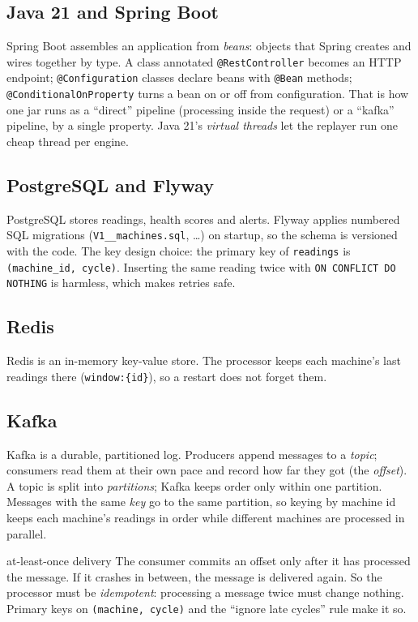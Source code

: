 \documentclass[11pt,a4paper]{article}
\begin{document}
\subsection{Java 21 and Spring Boot}
Spring Boot assembles an application from \emph{beans}: objects that Spring creates and wires together by
type. A class annotated \texttt{@RestController} becomes an HTTP endpoint; \texttt{@Configuration} classes
declare beans with \texttt{@Bean} methods; \texttt{@ConditionalOnProperty} turns a bean on or off from
configuration. That is how one jar runs as a ``direct'' pipeline (processing inside the request) or a
``kafka'' pipeline, by a single property. Java 21's \emph{virtual threads} let the replayer run one cheap
thread per engine.

\subsection{PostgreSQL and Flyway}
PostgreSQL stores readings, health scores and alerts. Flyway applies numbered SQL migrations
(\texttt{V1\_\_machines.sql}, \ldots) on startup, so the schema is versioned with the code. The key design
choice: the primary key of \texttt{readings} is \texttt{(machine\_id, cycle)}. Inserting the same reading
twice with \texttt{ON CONFLICT DO NOTHING} is harmless, which makes retries safe.

\subsection{Redis}
Redis is an in-memory key-value store. The processor keeps each machine's last \Window{} readings there
(\texttt{window:\{id\}}), so a restart does not forget them.

\subsection{Kafka}
Kafka is a durable, partitioned log. Producers append messages to a \emph{topic}; consumers read them at their
own pace and record how far they got (the \emph{offset}). A topic is split into \emph{partitions}; Kafka keeps
order only within one partition. Messages with the same \emph{key} go to the same partition, so keying by
machine id keeps each machine's readings in order while different machines are processed in parallel.

\begin{keyidea}{at-least-once delivery}
The consumer commits an offset only after it has processed the message. If it crashes in between, the message
is delivered again. So the processor must be \emph{idempotent}: processing a message twice must change
nothing. Primary keys on \texttt{(machine, cycle)} and the ``ignore late cycles'' rule make it so.
\end{keyidea}
\end{document}

